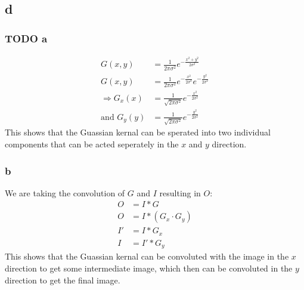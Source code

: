 \documentclass[11pt]{article}
\begin{document}
\subsection{d}
\label{sec:orge89a644}
\subsubsection{{\bfseries\sffamily TODO} a}
\label{sec:org418dfb8}
\begin{align*}
G(x,y)&=\frac{1}{2\pi \sigma^{2}}e^{-\frac{x^2+y^2}{2 \sigma^2}} \\
G(x,y)&=\frac{1}{2\pi \sigma^{2}}e^{-\frac{x^2}{2 \sigma^2}}e^{-\frac{y^2}{2 \sigma^2}} \\
\Rightarrow G_x(x)&=\frac{1}{\sqrt{2\pi \sigma^{2}}}e^{-\frac{x^2}{2 \sigma^2}} \\
\textrm{and } G_y(y)&=\frac{1}{\sqrt{2\pi \sigma^{2}}}e^{-\frac{y^2}{2 \sigma^2}}
\end{align*}
This shows that the Guassian kernal can be sperated into two individual components that can be acted seperately in the \(x\) and \(y\) direction.
\subsubsection{b}
\label{sec:org9e92d05}
We are taking the convolution of \(G\) and \(I\) resulting in \(O\):
\begin{align*}
O&=I*G                     \\
O&=I*(G_x\cdot G_y)        \\
I'&=I*G_x                  \\
I&=I'* G_y
\end{align*}
This shows that the Guassian kernal can be convoluted with the image in the \(x\) direction to get some intermediate image, which then can be convoluted in the \(y\) direction to get the final image.
\end{document}
